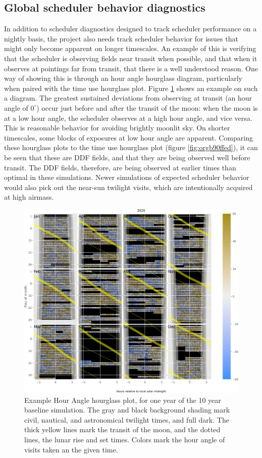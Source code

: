 \subsection{Global scheduler behavior diagnostics}
\label{sec:orgbd583b1}
In addition to scheduler diagnostics designed to track scheduler performance on a nightly basis, the project also needs track scheduler behavior for issues that might only become apparent on longer timescales.
An example of this is verifying that the scheduler is observing fields near transit when possible, and that when it observes at pointings far from transit, that there is a well understood reason.
One way of showing this is through an hour angle hourglass diagram, particularly when paired with the time use hourglass plot.
Figure \ref{fig:org258a41b} shows an example on such a diagram.
The greatest sustained deviations from observing at transit (an hour angle of \(0^{\circ}\)) occur just before and after the transit of the moon: when the moon is at a low hour angle, the scheduler observes at a high hour angle, and vice versa.
This is reasonable behavior for avoiding brightly moonlit sky.
On shorter timescales, some blocks of exposures at low hour angle are apparent.
Comparing these hourglass plots to the time use hourglass plot (figure \ref{fig:orgb90ffed}), it can be seen that these are DDF fields, and that they are being observed well before transit.
The DDF fields, therefore, are being observed at earlier times than optimal in these simulations.
Newer simulations of expected scheduler behavior would also pick out the near-sun twilight visits, which are intentionally acquired at high airmass. 

\begin{figure}[htbp]
\centering
\includegraphics[width=1.0\textwidth]{./figures/hour_angle_hourglass.png}
\caption{\label{fig:org258a41b}Example Hour Angle hourglass plot, for one year of the 10 year baseline simulation. The gray and black background shading mark civil, nautical, and astronomical twilight times, and full dark. The thick yellow lines mark the transit of the moon, and the dotted lines, the lunar rise and set times. Colors mark the hour angle of visits taken an the given time.}
\end{figure}

